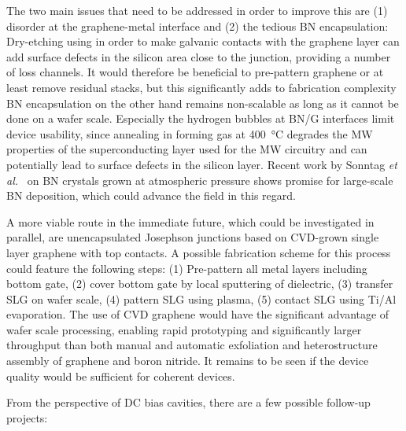 The two main issues that need to be addressed in order to improve this are (1) disorder at the graphene-metal interface and (2) the tedious BN encapsulation:
Dry-etching using  in order to make galvanic contacts with the graphene layer can add surface defects in the silicon area close to the junction, providing a number of loss channels.
%
It would therefore be beneficial to pre-pattern graphene or at least remove residual stacks, but this significantly adds to fabrication complexity
%
BN encapsulation on the other hand remains non-scalable as long as it cannot be done on a wafer scale.
%
Especially the hydrogen bubbles at BN/G interfaces limit device usability, since annealing in forming gas at \SI{400}{\celsius} degrades the MW properties of the superconducting layer used for the MW circuitry and can potentially lead to surface defects in the silicon layer.
%
Recent work by Sonntag \textit{et al.}~\cite{sonntagExcellentElectronicTransport2020} on BN crystals grown at atmospheric pressure shows promise for large-scale BN deposition, which could advance the field in this regard.

A more viable route in the immediate future, which could be investigated in parallel, are unencapsulated Josephson junctions based on CVD-grown single layer graphene with top contacts.
%
A possible fabrication scheme for this process could feature the following steps:
%
(1) Pre-pattern all metal layers including bottom gate, (2) cover bottom gate by local sputtering of dielectric, (3) transfer SLG on wafer scale, (4) pattern SLG using  plasma, (5) contact SLG using Ti/Al evaporation.
%
The use of CVD graphene would have the significant advantage of wafer scale processing, enabling rapid prototyping and significantly larger throughput than both manual and automatic exfoliation and heterostructure assembly of graphene and boron nitride.
%
It remains to be seen if the device quality would be sufficient for coherent devices.


From the perspective of DC bias cavities, there are a few possible follow-up projects:

